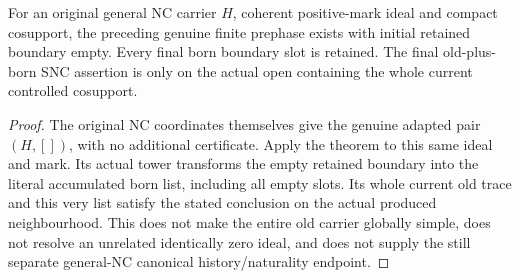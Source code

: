 \begin{corollary}
\label{hir:nc-original-empty-retained-finite-permitted-prephase}
\leanok
For an original general NC carrier $H$, coherent positive-mark ideal and
compact cosupport, the preceding genuine finite prephase exists with
initial retained boundary empty. Every final born boundary slot is
retained. The final old-plus-born SNC assertion is only on the actual
open containing the whole current controlled cosupport.
\end{corollary}
\begin{proof}
The original NC coordinates themselves give the genuine adapted pair
$(H,[])$, with no additional certificate. Apply the theorem to this same
ideal and mark. Its actual tower transforms the empty retained boundary
into the literal accumulated born list, including all empty slots. Its
whole current old trace and this very list satisfy the stated conclusion
on the actual produced neighbourhood. This does not make the entire old
carrier globally simple, does not resolve an unrelated identically zero
ideal, and does not supply the still separate general-NC canonical
history/naturality endpoint.
\end{proof}
